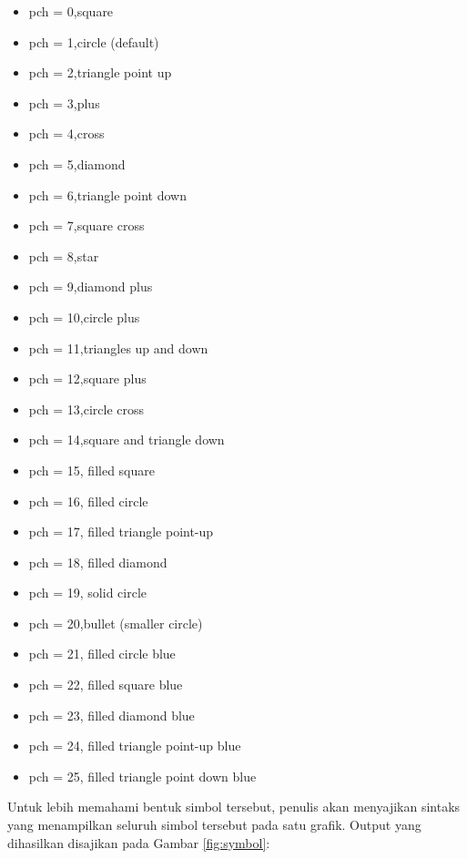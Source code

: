 \documentclass[
]{book}
\providecommand{\tightlist}{%
  \setlength{\itemsep}{0pt}\setlength{\parskip}{0pt}}
\theoremstyle{definition}
\theoremstyle{definition}
\theoremstyle{definition}
\theoremstyle{definition}
\theoremstyle{remark}
\begin{document}
\begin{itemize}
\tightlist
\item
  pch = 0,square
\item
  pch = 1,circle (default)
\item
  pch = 2,triangle point up
\item
  pch = 3,plus
\item
  pch = 4,cross
\item
  pch = 5,diamond
\item
  pch = 6,triangle point down
\item
  pch = 7,square cross
\item
  pch = 8,star
\item
  pch = 9,diamond plus
\item
  pch = 10,circle plus
\item
  pch = 11,triangles up and down
\item
  pch = 12,square plus
\item
  pch = 13,circle cross
\item
  pch = 14,square and triangle down
\item
  pch = 15, filled square
\item
  pch = 16, filled circle
\item
  pch = 17, filled triangle point-up
\item
  pch = 18, filled diamond
\item
  pch = 19, solid circle
\item
  pch = 20,bullet (smaller circle)
\item
  pch = 21, filled circle blue
\item
  pch = 22, filled square blue
\item
  pch = 23, filled diamond blue
\item
  pch = 24, filled triangle point-up blue
\item
  pch = 25, filled triangle point down blue
\end{itemize}

Untuk lebih memahami bentuk simbol tersebut, penulis akan menyajikan sintaks yang menampilkan seluruh simbol tersebut pada satu grafik. Output yang dihasilkan disajikan pada Gambar \ref{fig:symbol}:
\end{document}
